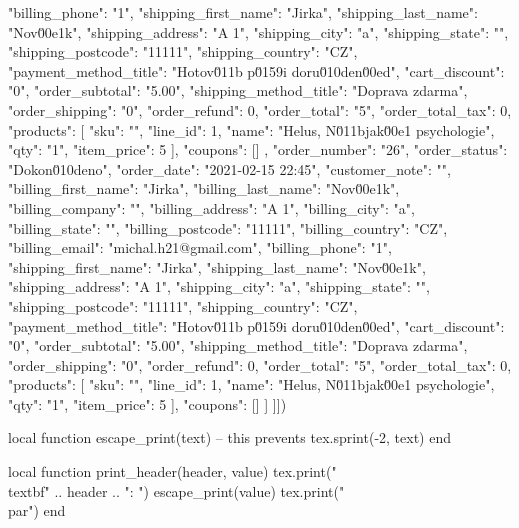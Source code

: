 \documentclass[landscape,a4page]{article}
\begin{document}
\begin{multicols*}{3}
\begin{luacode*}
{    "billing_phone": "1",
    "shipping_first_name": "Jirka",
    "shipping_last_name": "Nov\u00e1k",
    "shipping_address": "A 1",
    "shipping_city": "a",
    "shipping_state": "",
    "shipping_postcode": "11111",
    "shipping_country": "CZ",
    "payment_method_title": "Hotov\u011b p\u0159i doru\u010den\u00ed",
    "cart_discount": "0",
    "order_subtotal": "5.00",
    "shipping_method_title": "Doprava zdarma",
    "order_shipping": "0",
    "order_refund": 0,
    "order_total": "5",
    "order_total_tax": 0,
    "products": [
        {
            "sku": "",
            "line_id": 1,
            "name": "Helus, N\u011bjak\u00e1 psychologie",
            "qty": "1",
            "item_price": 5
        }
    ],
    "coupons": []
},
{
    "order_number": "26",
    "order_status": "Dokon\u010deno",
    "order_date": "2021-02-15 22:45",
    "customer_note": "",
    "billing_first_name": "Jirka",
    "billing_last_name": "Nov\u00e1k",
    "billing_company": "",
    "billing_address": "A 1",
    "billing_city": "a",
    "billing_state": "",
    "billing_postcode": "11111",
    "billing_country": "CZ",
    "billing_email": "michal.h21@gmail.com",
    "billing_phone": "1",
    "shipping_first_name": "Jirka",
    "shipping_last_name": "Nov\u00e1k",
    "shipping_address": "A 1",
    "shipping_city": "a",
    "shipping_state": "",
    "shipping_postcode": "11111",
    "shipping_country": "CZ",
    "payment_method_title": "Hotov\u011b p\u0159i doru\u010den\u00ed",
    "cart_discount": "0",
    "order_subtotal": "5.00",
    "shipping_method_title": "Doprava zdarma",
    "order_shipping": "0",
    "order_refund": 0,
    "order_total": "5",
    "order_total_tax": 0,
    "products": [
        {
            "sku": "",
            "line_id": 1,
            "name": "Helus, N\u011bjak\u00e1 psychologie",
            "qty": "1",
            "item_price": 5
        }
    ],
    "coupons": []
}
]
]])



local function escape_print(text)
  -- this prevents
  tex.sprint(-2, text)
end

local function print_header(header, value)
  tex.print("\\textbf{" .. header .. ":} ")
  escape_print(value)
  tex.print("\\par")
end


\end{luacode*}
\end{multicols*}
\end{document}
